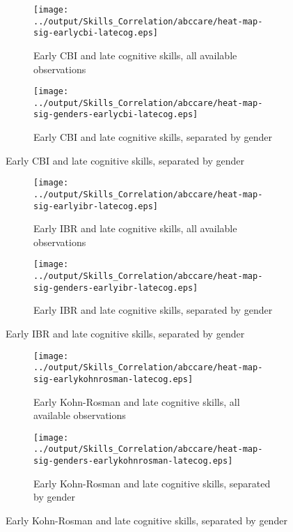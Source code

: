     \begin{figure}[H]
      \centering
      \caption{Heat map with $p$-values of early non-cognitive instruments against late cognitive skills}
      \label{fig:earlysocio-latecog}
      \begin{subfigure}{0.85\textwidth}  
        \centering
        \caption{Early CBI and late cognitive skills, all available observations}        
        \texttt{[image: ../output/Skills\_Correlation/abccare/heat-map-sig-earlycbi-latecog.eps]}
        \label{fig:earlycbi-latecog-nogender} 
      \end{subfigure}

      \begin{subfigure}{0.85\textwidth} 
        \centering
        \caption{Early CBI and late cognitive skills, separated by gender}        
        \texttt{[image: ../output/Skills\_Correlation/abccare/heat-map-sig-genders-earlycbi-latecog.eps]}
        \label{fig:earlycbi-latecog-gender} 
      \end{subfigure}
    \end{figure}
    \clearpage
    \begin{figure}[H]
      \ContinuedFloat \centering
      \begin{subfigure}{0.85\textwidth}
        \centering
        \caption{Early IBR and late cognitive skills, all available observations}         
        \texttt{[image: ../output/Skills\_Correlation/abccare/heat-map-sig-earlyibr-latecog.eps]}
        \label{fig:earlyibr-latecog-nogender}
      \end{subfigure} 

      \begin{subfigure}{0.85\textwidth} 
        \centering
        \caption{Early IBR and late cognitive skills, separated by gender}         
        \texttt{[image: ../output/Skills\_Correlation/abccare/heat-map-sig-genders-earlyibr-latecog.eps]}
        \label{fig:earlyibr-latecog-gender}
      \end{subfigure}
    \end{figure}
    \clearpage
    \begin{figure}[H]
      \ContinuedFloat \centering
      \begin{subfigure}{0.85\textwidth}  
        \centering
        \caption{Early Kohn-Rosman and late cognitive skills, all available observations}        
        \texttt{[image: ../output/Skills\_Correlation/abccare/heat-map-sig-earlykohnrosman-latecog.eps]}
        \label{fig:earlykohnrosman-latecog-nogender}
      \end{subfigure} 

      \begin{subfigure}{0.85\textwidth} 
        \centering
        \caption{Early Kohn-Rosman and late cognitive skills, separated by gender}        
        \texttt{[image: ../output/Skills\_Correlation/abccare/heat-map-sig-genders-earlykohnrosman-latecog.eps]}
        \label{fig:earlykohnrosman-latecog-gender}
      \end{subfigure} 
    \end{figure}

